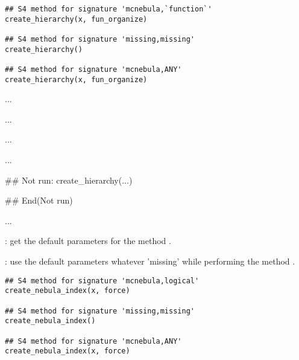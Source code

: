 \documentclass[letterpaper]{book}
\begin{document}
%
\begin{Usage}
\begin{verbatim}
## S4 method for signature 'mcnebula,`function`'
create_hierarchy(x, fun_organize)

## S4 method for signature 'missing,missing'
create_hierarchy()

## S4 method for signature 'mcnebula,ANY'
create_hierarchy(x, fun_organize)
\end{verbatim}
\end{Usage}
%
\begin{Arguments}
\begin{ldescription}
\item[\code{x}] ...

\item[\code{fun\_organize}] ...
\end{ldescription}
\end{Arguments}
%
\begin{Details}\relax
...
\end{Details}
%
\begin{Value}
...
\end{Value}
%
\begin{Examples}
\begin{ExampleCode}
## Not run: 
create_hierarchy(...)

## End(Not run)
\end{ExampleCode}
\end{Examples}
%
\begin{Description}\relax
...

: get the default parameters for the method
.

: use the default parameters whatever 'missing'
while performing the method .
\end{Description}
%
\begin{Usage}
\begin{verbatim}
## S4 method for signature 'mcnebula,logical'
create_nebula_index(x, force)

## S4 method for signature 'missing,missing'
create_nebula_index()

## S4 method for signature 'mcnebula,ANY'
create_nebula_index(x, force)
\end{verbatim}
\end{Usage}
\end{document}
